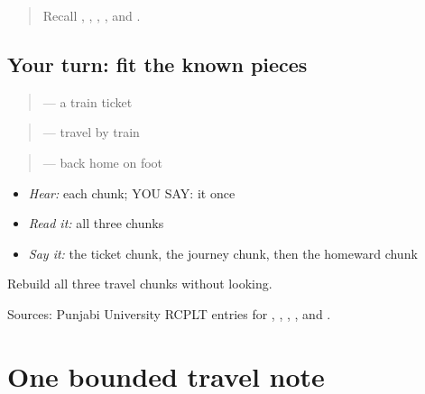 \label{lesson:PA-C181-travel-review}



\begin{quote}
Recall \textbf{}, \textbf{}, \textbf{}, \textbf{}, and \textbf{}.
\end{quote}

\subsection*{Your turn: fit the known pieces}
\begin{quote}
\textbf{  } — a train ticket
\end{quote}

\begin{quote}
\textbf{  } — travel by train
\end{quote}

\begin{quote}
\textbf{  } — back home on foot
\end{quote}

\begin{itemize}
\raggedright
  \item \emph{Hear:} each chunk; YOU SAY: it once
  \item \emph{Read it:} all three chunks
  \item \emph{Say it:} the ticket chunk, the journey chunk, then the homeward chunk
\end{itemize}

\begin{tcolorbox}[breakable,colback=teal!4,colframe=teal!35!black,title={Before you move on}]
Rebuild all three travel chunks without looking.

Sources: Punjabi University RCPLT entries for \href{https://dic.learnpunjabi.org/default.aspx?look=\%E0\%A8\%B0\%E0\%A9\%87\%E0\%A8\%B2}{}, \href{https://dic.learnpunjabi.org/default.aspx?look=\%E0\%A8\%9F\%E0\%A8\%BF\%E0\%A8\%95\%E0\%A8\%9F}{}, \href{https://dic.learnpunjabi.org/default.aspx?look=\%E0\%A8\%AF\%E0\%A8\%BE\%E0\%A8\%A4\%E0\%A8\%B0\%E0\%A8\%BE}{}, \href{https://dic.learnpunjabi.org/default.aspx?look=\%E0\%A8\%B5\%E0\%A8\%BE\%E0\%A8\%AA\%E0\%A8\%B8}{}, and \href{https://dic.learnpunjabi.org/default.aspx?look=\%E0\%A8\%AA\%E0\%A9\%88\%E0\%A8\%A6\%E0\%A8\%B2}{}.
\end{tcolorbox}
\section[\texorpdfstring{\pa{ਰੇਲ} \pa{ਦੀ} \pa{ਟਿਕਟ} \pa{ਇੱਥੇ} \pa{ਹੈ।} … (rel di tikat …)}{ਰੇਲ ਦੀ ਟਿਕਟ ਇੱਥੇ ਹੈ। … (rel di tikat …)}]{One bounded travel note}

